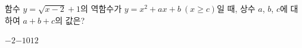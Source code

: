 \hspace*{2mm}\begin{minipage}[t]{\dimexpr\linewidth-2mm\relax}\vspace{0pt}
함수 $y=\sqrt{x-2}+1$의 역함수가 $y=x^2+ax+b\ (x\ge c)$일 때, 상수 $a$, $b$, $c$에 대하여 $a+b+c$의 값은?
\begin{choices32}{$-2$}{$-1$}{$0$}{$1$}{$2$}\end{choices32}\end{minipage}
